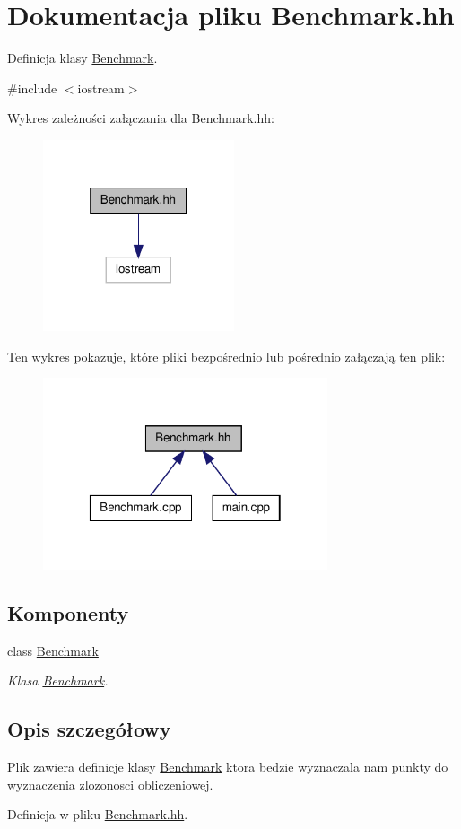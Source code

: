 \hypertarget{_benchmark_8hh}{
\section{Dokumentacja pliku Benchmark.hh}
\label{_benchmark_8hh}
}


Definicja klasy \hyperlink{class_benchmark}{Benchmark}.  


{\ttfamily \#include $<$iostream$>$}\par
Wykres zależności załączania dla Benchmark.hh:
\nopagebreak
\begin{figure}[H]
\begin{center}
\leavevmode
\includegraphics[width=160pt]{_benchmark_8hh__incl}
\end{center}
\end{figure}
Ten wykres pokazuje, które pliki bezpośrednio lub pośrednio załączają ten plik:
\nopagebreak
\begin{figure}[H]
\begin{center}
\leavevmode
\includegraphics[width=238pt]{_benchmark_8hh__dep__incl}
\end{center}
\end{figure}
\subsection*{Komponenty}
\begin{DoxyCompactItemize}
\item 
class \hyperlink{class_benchmark}{Benchmark}
\begin{DoxyCompactList}\small\item\em Klasa \hyperlink{class_benchmark}{Benchmark}. \item\end{DoxyCompactList}\end{DoxyCompactItemize}


\subsection{Opis szczegółowy}
Plik zawiera definicje klasy \hyperlink{class_benchmark}{Benchmark} ktora bedzie wyznaczala nam punkty do wyznaczenia zlozonosci obliczeniowej. 

Definicja w pliku \hyperlink{_benchmark_8hh_source}{Benchmark.hh}.

